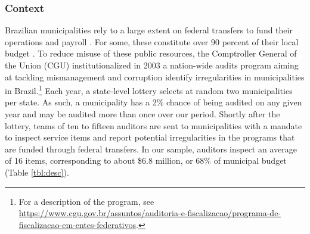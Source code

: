 \subsubsection*{Context}


Brazilian municipalities rely to a large extent on federal transfers to fund their operations and payroll \citep{arretche_politicas_1999}. For some, these constitute over 90 percent of their local budget \citep{prado_transferencias_2001}. To reduce misuse of these public resources, the Comptroller General of the Union (CGU) institutionalized in 2003 a nation-wide audits program aiming at tackling mismanagement and corruption identify irregularities in municipalities in Brazil.\footnote{For a description of the program, see \url{https://www.cgu.gov.br/assuntos/auditoria-e-fiscalizacao/programa-de-fiscalizacao-em-entes-federativos}.} Each year, a state-level lottery selects at random two municipalities per state. As such, a municipality has a 2\% chance of being audited on any given year and may be audited more than once over our period. Shortly after the lottery, teams of ten to fifteen auditors are sent to municipalities with a mandate to inspect service items and report potential irregularities in the programs that are funded through federal transfers. In our sample, auditors inspect an average of 16 items, corresponding to about \$6.8 million, or 68\% of municipal budget (Table \ref{tbl:desc}). 

